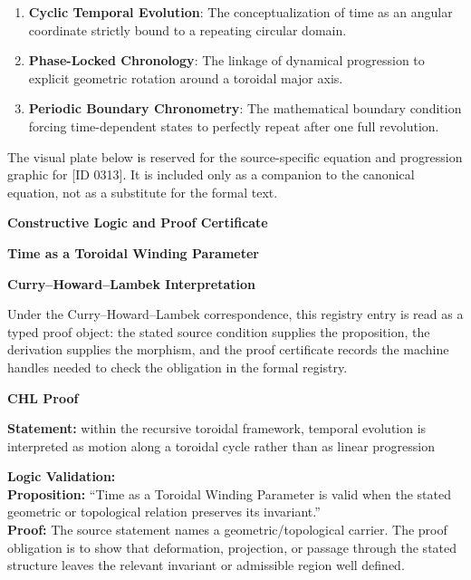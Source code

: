 \begin{enumerate}[leftmargin=1.6em,itemsep=6pt,topsep=4pt]
\item \textbf{Cyclic Temporal Evolution}: The conceptualization of time as an angular coordinate strictly bound to a repeating circular domain.
\item \textbf{Phase-Locked Chronology}: The linkage of dynamical progression to explicit geometric rotation around a toroidal major axis.
\item \textbf{Periodic Boundary Chronometry}: The mathematical boundary condition forcing time-dependent states to perfectly repeat after one full revolution.
\end{enumerate}

\begingroup\footnotesize\sloppy
The visual plate below is reserved for the source-specific equation and progression graphic for [ID 0313]. It is included only as a companion to the canonical equation, not as a substitute for the formal text.
\par\endgroup
\ifTZPDarkEdition
{}
\fi

\clearpage
\begingroup\tzpsupportsetup
\noindent\textbf{\fontsize{10.8pt}{12.8pt}\selectfont [ID 0313] Constructive Logic and Proof Certificate}\par
\noindent\textbf{\fontsize{10pt}{12pt}\selectfont Time as a Toroidal Winding Parameter}\par
\vspace{0.45em}
\begingroup
\footnotesize
\setlength{\parskip}{0.22em}
\setlength{\parindent}{0pt}
\noindent\textbf{Curry--Howard--Lambek Interpretation}\par
Under the Curry--Howard--Lambek correspondence, this registry entry is read as a typed proof
object: the stated source condition supplies the proposition, the derivation supplies the
morphism, and the proof certificate records the machine handles needed to check the obligation
in the formal registry.

\vspace{0.45em}
\noindent\textbf{CHL Proof}\par
\textbf{Statement:} within the recursive toroidal framework, temporal evolution is interpreted as motion
along a toroidal cycle rather than as linear progression

\textbf{Logic Validation:}\\
\textbf{Proposition:} ``Time as a Toroidal Winding Parameter is valid when the stated geometric or topological
relation preserves its invariant.''\\
\textbf{Proof:} The source statement names a geometric/topological carrier. The proof obligation is to
show that deformation, projection, or passage through the stated structure leaves the
relevant invariant or admissible region well defined.

